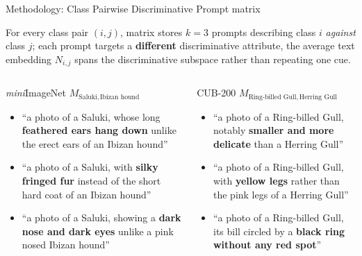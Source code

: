\documentclass[aspectratio=169,10pt]{beamer}
\begin{document}
\begin{frame}{Methodology: Class Pairwise Discriminative Prompt matrix}

    \begin{block}{}
        \footnotesize
        For every class pair $(i,j)$, matrix stores $k{=}3$ prompts describing class $i$ \emph{against} class $j$; each prompt targets a \textbf{different} discriminative attribute, the average text embedding $N_{i,j}$ spans the discriminative subspace rather than repeating one cue.
    \end{block}

    \vspace{0.2em}
    \begin{columns}[c]
        {\scriptsize
        \begin{exampleblock}{\emph{mini}ImageNet \quad $M_{\text{Saluki},\,\text{Ibizan hound}}$}
            \begin{itemize}\setlength{\itemsep}{0pt}
                \item[1.] ``a photo of a Saluki, whose long \textbf{feathered ears hang down} unlike the erect ears of an Ibizan hound''
                \item[2.] ``a photo of a Saluki, with \textbf{silky fringed fur} instead of the short hard coat of an Ibizan hound''
                \item[3.] ``a photo of a Saluki, showing a \textbf{dark nose and dark eyes} unlike a pink nosed Ibizan hound''
            \end{itemize}
        \end{exampleblock}

        \vspace{-0.3em}
        \begin{exampleblock}{CUB-200 \quad $M_{\text{Ring-billed Gull},\,\text{Herring Gull}}$}
            \begin{itemize}\setlength{\itemsep}{0pt}
                \item[1.] ``a photo of a Ring-billed Gull, notably \textbf{smaller and more delicate} than a Herring Gull''
                \item[2.] ``a photo of a Ring-billed Gull, with \textbf{yellow legs} rather than the pink legs of a Herring Gull''
                \item[3.] ``a photo of a Ring-billed Gull, its bill circled by a \textbf{black ring without any red spot}''
            \end{itemize}
        \end{exampleblock}
        }


\end{columns}
\end{frame}
\end{document}
